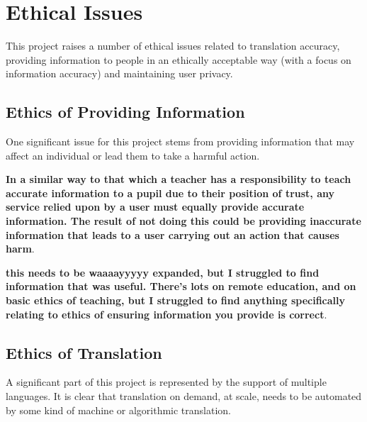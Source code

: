 \documentclass[authoryearcitations]{UoYCSproject}
\begin{document}

\section{Ethical Issues}
This project raises a number of ethical issues related to translation accuracy, providing information to people in an ethically acceptable way (with a focus on information accuracy) and maintaining user privacy.

\subsection{Ethics of Providing Information}
One significant issue for this project stems from providing information that may affect an individual or lead them to take a harmful action.


{\bf In a similar way to that which a teacher has a responsibility to teach accurate information to a pupil due to their position of trust, any service relied upon by a user must equally provide accurate information.  The result of not doing this could be providing inaccurate information that leads to a user carrying out an action that causes harm}.



{\bf this needs to be waaaayyyyy expanded, but I struggled to find information that was useful.  There's lots on remote education, and on basic ethics of teaching, but I struggled to find anything specifically relating to ethics of ensuring information you provide is correct}.


\subsection{Ethics of Translation}
\label{subsec:ethicsOfTranslation}
A significant part of this project is represented by the support of multiple languages.  It is clear that translation on demand, at scale, needs to be automated by some kind of machine or algorithmic translation.
\end{document}
